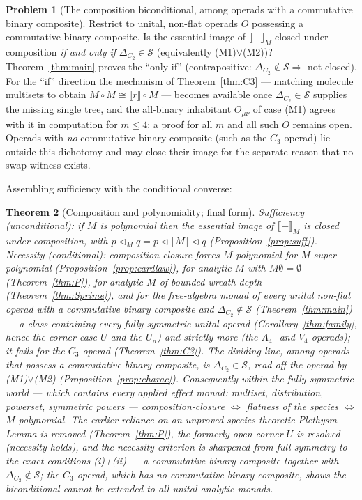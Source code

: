 \documentclass[11pt]{amsart}
\theoremstyle{plain}
\newtheorem{theorem}{Theorem}[section]
\theoremstyle{definition}
\newtheorem{problem}[theorem]{Problem}
\newcommand{\ext}[1]{\llbracket #1 \rrbracket}
\newcommand{\extM}[1]{\llbracket #1 \rrbracket_{M}}
\newcommand{\ceil}[1]{\lceil #1 \rceil}
\begin{document}
\begin{problem}[The composition biconditional, among operads with a commutative binary composite]\label{prob:residual}
Restrict to unital, non-flat operads $O$ possessing a commutative binary composite. Is the essential image
of $\extM{-}$ closed under composition \emph{if and only if} $\Delta_{C_2}\in\mathcal S$ (equivalently
(M1)$\vee$(M2))? Theorem~\ref{thm:main} proves the ``only if'' (contrapositive:
$\Delta_{C_2}\notin\mathcal S\Rightarrow$ not closed). For the ``if'' direction the mechanism of
Theorem~\ref{thm:C3} --- matching molecule multisets to obtain $M\circ M\cong\ext r\circ M$ --- becomes
available once $\Delta_{C_2}\in\mathcal S$ supplies the missing single tree, and the all-binary inhabitant
$O_{\mu\nu}$ of case (M1) agrees with it in computation for $m\le4$; a proof for all $m$ and all such $O$
remains open. Operads with \emph{no} commutative binary composite (such as the $C_3$ operad) lie outside
this dichotomy and may close their image for the separate reason that no swap witness exists.
\end{problem}

Assembling sufficiency with the conditional converse:

\begin{theorem}[Composition and polynomiality; final form]\label{thm:3final}
\emph{Sufficiency \textup{(}unconditional\textup{)}:} if $M$ is polynomial then the essential image of
$\extM{-}$ is closed under composition, with $p\triangleleft_M q=p\triangleleft\ceil M\triangleleft q$
\textup{(}Proposition~\ref{prop:suff}\textup{)}. \emph{Necessity \textup{(}conditional\textup{)}:}
composition-closure forces $M$ polynomial for $M$ super-polynomial (Proposition~\ref{prop:cardlaw}), for
analytic $M$ with $M\emptyset=\emptyset$ (Theorem~\ref{thm:P}), for analytic $M$ of bounded wreath depth
(Theorem~\ref{thm:Sprime}), and for the free-algebra monad of every unital non-flat operad with a
commutative binary composite and $\Delta_{C_2}\notin\mathcal S$ (Theorem~\ref{thm:main}) --- a class
containing every fully symmetric unital operad (Corollary~\ref{thm:family}, hence the corner case $U$ and
the $U_n$) and strictly more (the $A_4$- and $V_4$-operads); it \emph{fails} for the $C_3$ operad
(Theorem~\ref{thm:C3}). The dividing line, among operads that possess a commutative binary composite, is
$\Delta_{C_2}\in\mathcal S$, read off the operad by (M1)$\vee$(M2) (Proposition~\ref{prop:charac}).
Consequently \emph{within the fully symmetric world --- which contains every applied effect monad:
multiset, distribution, powerset, symmetric powers --- composition-closure $\iff$ flatness of the species
$\iff$ $M$ polynomial}. The earlier reliance on an unproved species-theoretic \emph{Plethysm Lemma} is
removed (Theorem~\ref{thm:P}), the formerly open corner $U$ is resolved (necessity holds), and the
necessity criterion is sharpened from full symmetry to the exact conditions (i)+(ii) --- a commutative
binary composite together with $\Delta_{C_2}\notin\mathcal S$; the $C_3$ operad, which has no commutative
binary composite, shows the biconditional cannot be extended to all unital analytic monads.
\end{theorem}
\end{document}
